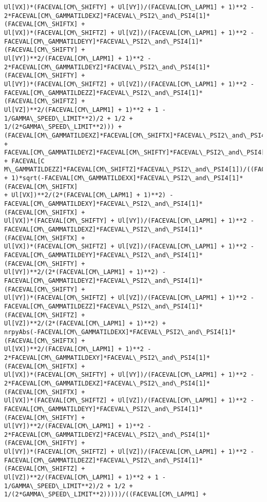 \documentclass[landscape,letterpaper,10pt,english]{article}
\begin{document}
\begin{Verbatim}[commandchars=\\\{\}]
Ul[VX])*(FACEVAL[CM\_SHIFTY] + Ul[VY])/(FACEVAL[CM\_LAPM1] + 1)**2 -
2*FACEVAL[CM\_GAMMATILDEXZ]*FACEVAL\_PSI2\_and\_PSI4[1]*(FACEVAL[CM\_SHIFTX] +
Ul[VX])*(FACEVAL[CM\_SHIFTZ] + Ul[VZ])/(FACEVAL[CM\_LAPM1] + 1)**2 -
FACEVAL[CM\_GAMMATILDEYY]*FACEVAL\_PSI2\_and\_PSI4[1]*(FACEVAL[CM\_SHIFTY] +
Ul[VY])**2/(FACEVAL[CM\_LAPM1] + 1)**2 -
2*FACEVAL[CM\_GAMMATILDEYZ]*FACEVAL\_PSI2\_and\_PSI4[1]*(FACEVAL[CM\_SHIFTY] +
Ul[VY])*(FACEVAL[CM\_SHIFTZ] + Ul[VZ])/(FACEVAL[CM\_LAPM1] + 1)**2 -
FACEVAL[CM\_GAMMATILDEZZ]*FACEVAL\_PSI2\_and\_PSI4[1]*(FACEVAL[CM\_SHIFTZ] +
Ul[VZ])**2/(FACEVAL[CM\_LAPM1] + 1)**2 + 1 - 1/GAMMA\_SPEED\_LIMIT**2)/2 + 1/2 +
1/(2*GAMMA\_SPEED\_LIMIT**2))) +
(FACEVAL[CM\_GAMMATILDEXZ]*FACEVAL[CM\_SHIFTX]*FACEVAL\_PSI2\_and\_PSI4[1] +
FACEVAL[CM\_GAMMATILDEYZ]*FACEVAL[CM\_SHIFTY]*FACEVAL\_PSI2\_and\_PSI4[1] + FACEVAL[C
M\_GAMMATILDEZZ]*FACEVAL[CM\_SHIFTZ]*FACEVAL\_PSI2\_and\_PSI4[1])/((FACEVAL[CM\_LAPM1]
+ 1)*sqrt(-FACEVAL[CM\_GAMMATILDEXX]*FACEVAL\_PSI2\_and\_PSI4[1]*(FACEVAL[CM\_SHIFTX]
+ Ul[VX])**2/(2*(FACEVAL[CM\_LAPM1] + 1)**2) -
FACEVAL[CM\_GAMMATILDEXY]*FACEVAL\_PSI2\_and\_PSI4[1]*(FACEVAL[CM\_SHIFTX] +
Ul[VX])*(FACEVAL[CM\_SHIFTY] + Ul[VY])/(FACEVAL[CM\_LAPM1] + 1)**2 -
FACEVAL[CM\_GAMMATILDEXZ]*FACEVAL\_PSI2\_and\_PSI4[1]*(FACEVAL[CM\_SHIFTX] +
Ul[VX])*(FACEVAL[CM\_SHIFTZ] + Ul[VZ])/(FACEVAL[CM\_LAPM1] + 1)**2 -
FACEVAL[CM\_GAMMATILDEYY]*FACEVAL\_PSI2\_and\_PSI4[1]*(FACEVAL[CM\_SHIFTY] +
Ul[VY])**2/(2*(FACEVAL[CM\_LAPM1] + 1)**2) -
FACEVAL[CM\_GAMMATILDEYZ]*FACEVAL\_PSI2\_and\_PSI4[1]*(FACEVAL[CM\_SHIFTY] +
Ul[VY])*(FACEVAL[CM\_SHIFTZ] + Ul[VZ])/(FACEVAL[CM\_LAPM1] + 1)**2 -
FACEVAL[CM\_GAMMATILDEZZ]*FACEVAL\_PSI2\_and\_PSI4[1]*(FACEVAL[CM\_SHIFTZ] +
Ul[VZ])**2/(2*(FACEVAL[CM\_LAPM1] + 1)**2) +
nrpyAbs(-FACEVAL[CM\_GAMMATILDEXX]*FACEVAL\_PSI2\_and\_PSI4[1]*(FACEVAL[CM\_SHIFTX] +
Ul[VX])**2/(FACEVAL[CM\_LAPM1] + 1)**2 -
2*FACEVAL[CM\_GAMMATILDEXY]*FACEVAL\_PSI2\_and\_PSI4[1]*(FACEVAL[CM\_SHIFTX] +
Ul[VX])*(FACEVAL[CM\_SHIFTY] + Ul[VY])/(FACEVAL[CM\_LAPM1] + 1)**2 -
2*FACEVAL[CM\_GAMMATILDEXZ]*FACEVAL\_PSI2\_and\_PSI4[1]*(FACEVAL[CM\_SHIFTX] +
Ul[VX])*(FACEVAL[CM\_SHIFTZ] + Ul[VZ])/(FACEVAL[CM\_LAPM1] + 1)**2 -
FACEVAL[CM\_GAMMATILDEYY]*FACEVAL\_PSI2\_and\_PSI4[1]*(FACEVAL[CM\_SHIFTY] +
Ul[VY])**2/(FACEVAL[CM\_LAPM1] + 1)**2 -
2*FACEVAL[CM\_GAMMATILDEYZ]*FACEVAL\_PSI2\_and\_PSI4[1]*(FACEVAL[CM\_SHIFTY] +
Ul[VY])*(FACEVAL[CM\_SHIFTZ] + Ul[VZ])/(FACEVAL[CM\_LAPM1] + 1)**2 -
FACEVAL[CM\_GAMMATILDEZZ]*FACEVAL\_PSI2\_and\_PSI4[1]*(FACEVAL[CM\_SHIFTZ] +
Ul[VZ])**2/(FACEVAL[CM\_LAPM1] + 1)**2 + 1 - 1/GAMMA\_SPEED\_LIMIT**2)/2 + 1/2 +
1/(2*GAMMA\_SPEED\_LIMIT**2)))))/((FACEVAL[CM\_LAPM1] +

\end{Verbatim}
\end{document}
